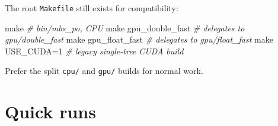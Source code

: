\documentclass[
  10pt,
  a4paper,
]{article}
\newenvironment{Shaded}{}{}
\newcommand{\CommentTok}[1]{\textcolor[rgb]{0.38,0.63,0.69}{\textit{#1}}}
\newcommand{\FunctionTok}[1]{\textcolor[rgb]{0.02,0.16,0.49}{#1}}
\newcommand{\NormalTok}[1]{#1}
\begin{document}
The root \texttt{Makefile} still exists for compatibility:

\begin{Shaded}
\begin{Highlighting}[]
\FunctionTok{make}                         \CommentTok{\# bin/mbs\_po, CPU}
\FunctionTok{make}\NormalTok{ gpu\_double\_fast         }\CommentTok{\# delegates to gpu/double\_fast}
\FunctionTok{make}\NormalTok{ gpu\_float\_fast          }\CommentTok{\# delegates to gpu/float\_fast}
\FunctionTok{make}\NormalTok{ USE\_CUDA=1              }\CommentTok{\# legacy single{-}tree CUDA build}
\end{Highlighting}
\end{Shaded}

Prefer the split \texttt{cpu/} and \texttt{gpu/} builds for normal work.

\section{Quick runs}\label{quick-runs}
\end{document}
